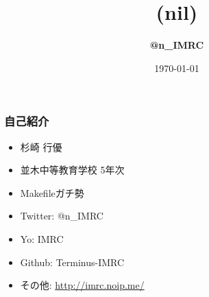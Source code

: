 \documentclass[dvipdfmx,20pt,notheorems,t]{beamer}
\title[(nil)]{(nil)}
\author[@n\_IMRC]{\textbf{@n\_IMRC}}
\institute[Namiki Secondary School]{並木中等教育学校}
\date{\today}
\begin{document}
\begin{frame}[plain]\frametitle{}
\titlepage
\end{frame}

\begin{frame}\frametitle{自己紹介}
\begin{itemize}
\item 杉崎 行優
\item 並木中等教育学校 5年次
\item Makefileガチ勢
\item Twitter: @n\_IMRC
\item Yo: IMRC
\item Github: Terminus-IMRC
\item その他: \url{http://imrc.noip.me/}
\end{itemize}
\end{frame}
\end{document}
